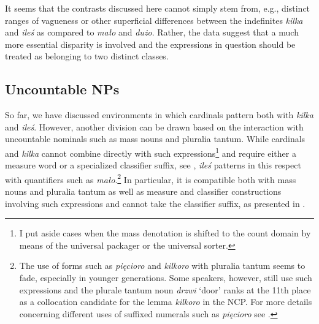 \documentclass[output=paper,
]{langscibook}
\begin{document}
	\ea \label{ex:distributive-po-malo} 
	\z
    \z

	\noindent It seems that the contrasts discussed here cannot simply stem from, e.g., distinct ranges of vagueness or other superficial differences between the indefinites \textit{kilka} and \textit{ileś} as compared to \textit{mało} and \textit{dużo}. Rather, the data suggest that a much more essential disparity is involved and the expressions in question should be treated as belonging to two distinct classes.
	
	\subsection{Uncountable NPs}\label{sec:uncountable-nps}
	
	So far, we have discussed environments in which cardinals pattern both with \textit{kilka} and \textit{ileś}. However, another division can be drawn based on the interaction with uncountable nominals such as mass nouns and pluralia tantum. While cardinals and \textit{kilka} cannot combine directly with such expressions\footnote{I put aside cases when the mass denotation is shifted to the count domain by means of the universal packager or the universal sorter.} and require either a measure word or a specialized classifier suffix, see , \textit{ileś} patterns in this respect with quantifiers such as \textit{mało}.\footnote{The use of forms such as \textit{pięcioro} and \textit{kilkoro} with pluralia tantum seems to fade, especially in younger generations. Some speakers, however, still use such expressions and the plurale tantum noun \textit{drzwi} `door' ranks at the 11th place as a collocation candidate for the lemma \textit{kilkoro} in the NCP. For more details concerning different uses of suffixed numerals such as \textit{pięcioro} see \cite{wagiel2014boys,wagiel2015sums}.} In particular, it is compatible both with mass nouns and pluralia tantum as well as measure and classifier constructions involving such expressions and cannot take the classifier suffix, as presented in .
	
\end{document}
